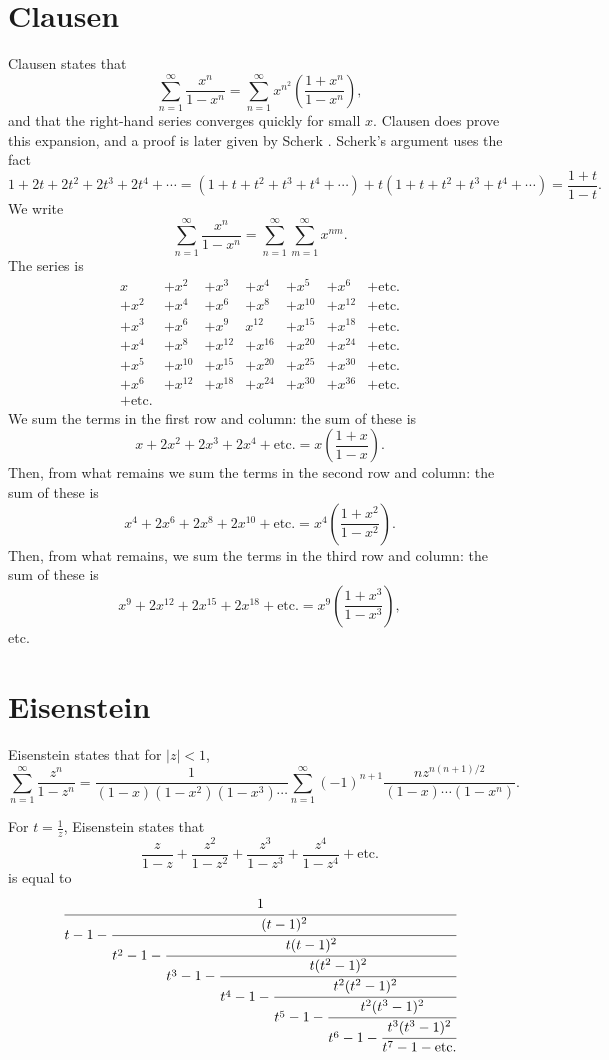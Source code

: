 \documentclass{article}
\begin{document}
\section{Clausen}
Clausen \cite{clausen} states that
\[
\sum_{n=1}^\infty \frac{x^n}{1-x^n} = \sum_{n=1}^\infty x^{n^2} \left(\frac{1+x^n}{1-x^n}\right),
\]
and that the right-hand series converges quickly for small $x$. Clausen does prove this expansion, and a proof
is later given by Scherk \cite{scherk}. Scherk's argument uses the fact
\[
1+2t+2t^2+2t^3+2t^4+\cdots = 
(1+t+t^2+t^3+t^4+\cdots) + t(1+t+t^2+t^3+t^4+\cdots)=
\frac{1+t}{1-t}.
\]
We write
\[
\sum_{n=1}^\infty \frac{x^n}{1-x^n} = \sum_{n=1}^\infty \sum_{m=1}^\infty x^{nm}.
\]
The series is
\[
\begin{array}{rrrrrrr}
x&+x^2&+x^3&+x^4&+x^5&+x^6&+\mathrm{etc.}\\
+x^2&+x^4&+x^6&+x^8&+x^{10}&+x^{12}&+\mathrm{etc.}\\
+x^3&+x^6&+x^9&x^{12}&+x^{15}&+x^{18}&+\mathrm{etc.}\\
+x^4&+x^8&+x^{12}&+x^{16}&+x^{20}&+x^{24}&+\mathrm{etc.}\\
+x^5&+x^{10}&+x^{15}&+x^{20}&+x^{25}&+x^{30}&+\mathrm{etc.}\\
+x^6&+x^{12}&+x^{18}&+x^{24}&+x^{30}&+x^{36}&+\mathrm{etc.}\\
+\mathrm{etc.}&&&&&&
\end{array}
\]
We sum the terms in the first row and column: the sum of these is
\[
x+2x^2+2x^3+2x^4+\mathrm{etc.} = x\left( \frac{1+x}{1-x}\right).
\]
Then, from what remains we sum the terms in the second row and column: the sum of these is
\[
x^4+2x^6+2x^8+2x^{10}+\mathrm{etc.} = x^4\left( \frac{1+x^2}{1-x^2}\right).
\]
 Then,
from what remains, we sum the terms in the third row and column: the sum of these is
\[
x^9+2x^{12}+2x^{15}+2x^{18}+\mathrm{etc.} = x^9\left(\frac{1+x^3}{1-x^3}\right),
\]
etc.


\section{Eisenstein}
Eisenstein \cite{eisenstein1844} states that
for $|z|<1$,
\[
\sum_{n=1}^\infty \frac{z^n}{1-z^n} =\frac{1}{(1-x)(1-x^2)(1-x^3)\cdots} \sum_{n=1}^\infty 
(-1)^{n+1} \frac{nz^{n(n+1)/2}}{(1-x)\cdots(1-x^n)}.
\]

For $t=\frac{1}{z}$,
Eisenstein states that
\[
\frac{z}{1-z}+\frac{z^2}{1-z^2}+\frac{z^3}{1-z^3}+\frac{z^4}{1-z^4}+\textrm{etc.}
\]
is equal to
\[
\cfrac{1}{t-1-\cfrac{(t-1)^2}{t^2-1-\cfrac{t(t-1)^2}{t^3-1-\cfrac{t(t^2-1)^2}{t^4-1-\cfrac{t^2(t^2-1)^2}{t^5-1-
\cfrac{t^2(t^3-1)^2}{t^6-1-\cfrac{t^3(t^3-1)^2}{t^7-1-\textrm{etc.}}}}}}}}
\]
\end{document}
